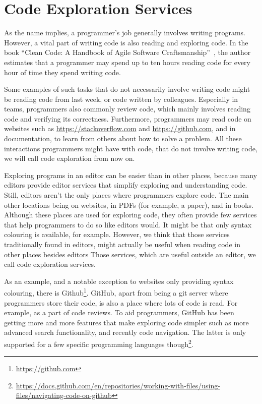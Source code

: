 
\chapter{Code Exploration Services}
\label{chap:code-exploration-services}

As the name implies, a programmer's job generally involves writing programs.
However, a vital part of writing code is also reading and exploring code.
In the book ``Clean Code: A Handbook of Agile Software Craftsmanship''~\autocite{martin_reading_code_ratio},
the author estimates that a programmer may spend up to ten hours reading code for every hour of time they spend writing code.

Some examples of such tasks that do not necessarily involve writing code might be reading code from last week, or code written by colleagues.
Especially in teams, programmers also commonly review code, which mainly involves reading code and verifying its correctness.
Furthermore, programmers may read code on websites such as \url{https://stackoverflow.com} and \url{https://github.com},
and in documentation, to learn from others about how to solve a problem.
All these interactions programmers might have with code, that do not involve writing code, we will call code exploration from now on.


Exploring programs in an editor can be easier than in other places, because many editors provide editor services that simplify exploring and understanding code.
Still, editors aren't the only places where programmers explore code.
The main other locations being on websites, in PDFs (for example, a paper), and in books.
Although these places are used for exploring code, they often provide few services that help programmers to do so like editors would.
It might be that only syntax colouring is available, for example.
However, we think that those services traditionally found in editors, might actually be useful when reading code in other places besides editors
Those services, which are useful outside an editor, we call code exploration services.

As an example, and a notable exception to websites only providing syntax colouring, there is Github\footnote{\url{https://github.com}}.
GitHub, apart from being a git server where programmers store their code, is also a place where lots of code is read.
For example, as a part of code reviews.
To aid programmers, GitHub has been getting more and more features that make exploring code simpler such
as more advanced search functionality, and recently code navigation.
The latter is only supported for a few specific programming languages though\footnote{\url{https://docs.github.com/en/repositories/working-with-files/using-files/navigating-code-on-github}}.

